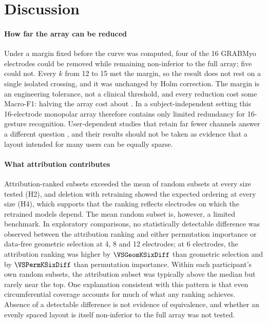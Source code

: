 \section{Discussion}
\label{sec:discussion}

\paragraph{How far the array can be reduced}
Under a margin fixed before the curve was computed, four of the 16 GRABMyo electrodes could be removed while remaining non-inferior to the full array; five could not. Every $k$ from 12 to 15 met the margin, so the result does not rest on a single isolated crossing, and it was unchanged by Holm correction. The margin is an engineering tolerance, not a clinical threshold, and every reduction cost some Macro-F1: halving the array cost about \DeltaKEight. In a subject-independent setting this 16-electrode monopolar array therefore contains only limited redundancy for 16-gesture recognition. User-dependent studies that retain far fewer channels answer a different question \citep{phinyomark2018emg,qu2021reduce}, and their results should not be taken as evidence that a layout intended for many users can be equally sparse.

\paragraph{What attribution contributes}
Attribution-ranked subsets exceeded the mean of random subsets at every size tested (H2), and deletion with retraining showed the expected ordering at every size (H4), which supports that the ranking reflects electrodes on which the retrained models depend. The mean random subset is, however, a limited benchmark. In exploratory comparisons, no statistically detectable difference was observed between the attribution ranking and either permutation importance or data-free geometric selection at 4, 8 and 12 electrodes; at 6 electrodes, the attribution ranking was higher by $\VSGeomKSixDiff$ than geometric selection and by $\VSPermKSixDiff$ than permutation importance. Within each participant's own random subsets, the attribution subset was typically above the median but rarely near the top. One explanation consistent with this pattern is that even circumferential coverage accounts for much of what any ranking achieves. Absence of a detectable difference is not evidence of equivalence, and whether an evenly spaced layout is itself non-inferior to the full array was not tested.

